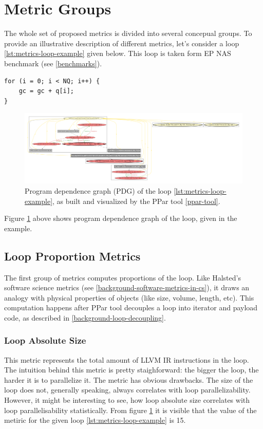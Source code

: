 \section{Metric Groups}
\label{metrics-metric-groups}
\qquad The whole set of proposed metrics is divided into several concepual groups. To provide an illustrative description of different metrics, let's consider a loop \ref{lst:metrics-loop-example} given below. This loop is taken form EP NAS benchmark (see \ref{benchmarks}).
\begin{lstlisting}[caption={Example loop, taken from EP NAS benchmark}, captionpos=b, label=lst:metrics-loop-example]
for (i = 0; i < NQ; i++) {
	gc = gc + q[i];
}
\end{lstlisting}

\begin{figure}[htb]
	\centering
	\includegraphics[width=\linewidth]{figs/metrics-example-loop-pdg.pdf}
	\caption{Program dependence graph (PDG) of the loop \ref{lst:metrics-loop-example}, as built and visualized by the PPar tool \ref{ppar-tool}.}
	\label{metrics-loop-example-pdg}
\end{figure}

\null\qquad Figure \ref{metrics-loop-example-pdg} above shows program dependence graph of the loop, given in the example. 


\subsection{Loop Proportion Metrics}
\label{metrics-loop-proportion-metrics}
\qquad The first group of metrics computes proportions of the loop. Like Halsted's software science metrics (see \ref{background-software-metrics-in-cs}), it draws an analogy with physical properties of objects (like size, volume, length, etc). This computation happens after PPar tool decouples a loop into iterator and payload code, as described in \ref{background-loop-decoupling}.  
\subsubsection{Loop Absolute Size}
\label{metrics-loop-absolute-size}
\qquad This metric represents the total amount of LLVM IR instructions in the loop. The intuition behind this metric is pretty staighforward: the bigger the loop, the harder it is to parallelize it. The metric has obvious drawbacks. The size of the loop does not, generally speaking, always correlates with loop parallelizability. However, it might be interesting to see, how loop absolute size correlates with loop parallelisability statistically. From figure \ref{metrics-loop-example-pdg} it is visible that the value of the metiric for the given loop \ref{lst:metrics-loop-example} is 15.
